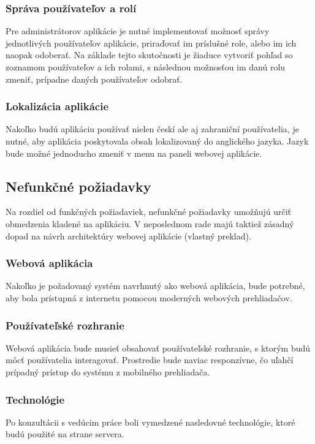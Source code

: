 \subsubsection{Správa používateľov a rolí}\label{sprava-pouzivatelov-a-roli}
Pre administrátorov aplikácie je nutné implementovať možnosť správy jednotlivých používateľov aplikácie, priraďovať im príslušné role, alebo im ich naopak odoberať. Na základe tejto skutočnosti je žiaduce vytvoriť pohľad so zoznamom používateľov a ich rolami, s následnou možnosťou im danú rolu zmeniť, prípadne daných používateľov odobrať.

\subsubsection{Lokalizácia aplikácie}
Nakoľko budú aplikáciu používať nielen českí ale aj zahraniční používatelia, je nutné, aby aplikácia poskytovala obsah lokalizovaný do anglického jazyka. Jazyk bude možné jednoducho zmeniť v menu na paneli webovej aplikácie.

\subsection{Nefunkčné požiadavky}
Na rozdiel od funkčných požiadaviek, nefunkčné požiadavky umožňujú určiť obmedzenia kladené na aplikáciu. V neposlednom rade majú taktiež zásadný dopad na návrh architektúry webovej aplikácie \cite{co-su-pripady-pouzitia}(vlastný preklad).

\subsubsection{Webová aplikácia}
Nakoľko je požadovaný systém navrhnutý ako webová aplikácia, bude potrebné, aby bola prístupná z internetu pomocou moderných webových prehliadačov.

\subsubsection{Používateľské rozhranie}
Webová aplikácia bude musieť obsahovať používateľské rozhranie, s ktorým budú môcť používatelia interagovať.
Prostredie bude naviac responzívne, čo uľahčí prípadný prístup do systému z mobilného prehliadača.

\subsubsection{Technológie}
Po konzultácii s vedúcim práce boli vymedzené nasledovné technológie, ktoré budú použité na strane servera.

